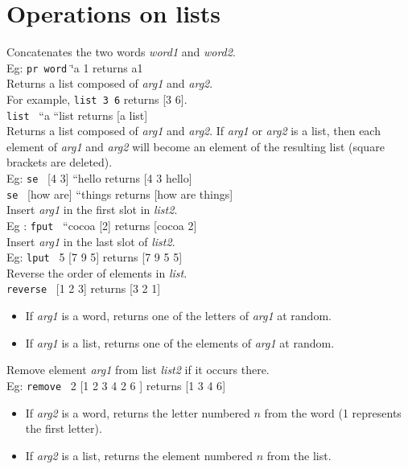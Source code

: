 \section{Operations on lists}
\noindent
{}
Concatenates the two words \textit{word1} and \textit{word2}.\\
 Eg: \texttt{pr word} \char`\"{}a 1 returns a1\\
Returns a list composed of \textit{arg1} and \textit{arg2}.\\
 For example, \texttt{list 3 6} returns {[}3 6{]}.\\
 \texttt{list} \ {}{}``a {}``list returns {[}a list{]}\\
Returns a list composed of \textit{arg1} and \textit{arg2}. If \textit{arg1} or \textit{arg2} is a list, then each
element of \textit{arg1} and \textit{arg2} will become an element of the resulting list (square
brackets are deleted).\\
 Eg: \texttt{se} \ {}{[}4 3{]} {}``hello returns {[}4 3 hello{]}\\
 \texttt{se} \ {}{[}how are{]} {}``things returns {[}how are things{]}\\
 Insert \textit{arg1} in the first slot in \textit{list2}.\\
 Eg : \texttt{fput} \ {}{}``cocoa {[}2{]} returns {[}cocoa 2{]}\\
 Insert \textit{arg1} in the last slot of \textit{list2}.\\
 Eg: \texttt{lput} \ 5 {[}7 9 5{]} returns {[}7 9 5 5{]}\\
 Reverse the order of elements in \textit{list}.\\
 \texttt{reverse} \ {}{[}1 2 3{]} returns {[}3 2 1{]}\\
\begin{itemize}
 \item If \textit{arg1} is a word, returns one of the letters of \textit{arg1} at random.
 \item  If \textit{arg1} is a list, returns one of the elements of \textit{arg1} at random.
\end{itemize}
\noindent
{}
Remove element \textit{arg1} from list \textit{list2} if it occurs there.\\
 Eg: \texttt{remove} \ 2 {[}1 2 3 4 2 6 {]} returns {[}1 3 4 6{]}\\
\begin{itemize}
 \item If \textit{arg2} is a word, returns the letter numbered $n$ from the word (1 represents the first letter).
 \item  If \textit{arg2} is a list, returns the element numbered $n$ from the list.
\end{itemize}
